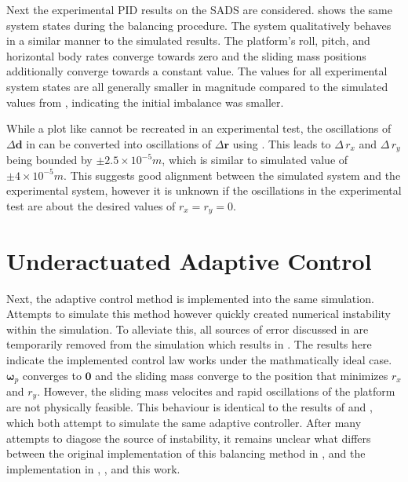 Next the experimental PID results on the SADS are considered.  shows the same system states during the balancing procedure. The system qualitatively behaves in a similar manner to the simulated results. The platform's roll, pitch, and horizontal body rates converge towards zero and the sliding mass positions additionally converge towards a constant value. The values for all experimental system states are all generally smaller in magnitude compared to the simulated values from , indicating the initial imbalance was smaller.  

While a plot like  cannot be recreated in an experimental test, the oscillations of $\Delta\bm{d}$ in  can be converted into oscillations of $\Delta\bm{r}$ using . This leads to $\Delta\,r_x$ and $\Delta\,r_y$ being bounded by $\pm2.5\times10^{-5}m$, which is similar to simulated value of $\pm4\times10^{-5}m$. This suggests good alignment between the simulated system and the experimental system, however it is unknown if the oscillations in the experimental test are about the desired values of $r_x = r_y = 0$.




\section{Underactuated Adaptive Control}

Next, the adaptive control method is implemented into the same simulation. Attempts to simulate this method however quickly created numerical instability within the simulation. To alleviate this, all sources of error discussed in  are temporarily removed from the simulation which results in . The results here indicate the implemented control law works under the mathmatically ideal case. $\bm{\omega}_p$ converges to $\bm{0}$ and the sliding mass converge to the position that minimizes $r_x$ and $r_y$. However, the sliding mass velocites and rapid oscillations of the platform are not physically feasible. This behaviour is identical to the results of \cite{silva_filtering_2018} and \cite{hudson_dynamic_2019}, which both attempt to simulate the same adaptive controller. After many attempts to diagose the source of instability, it remains unclear what differs between the original implementation of this balancing method in \cite{chesi_automatic_2014}, and the implementation in \cite{silva_filtering_2018}, \cite{hudson_dynamic_2019}, and this work.

